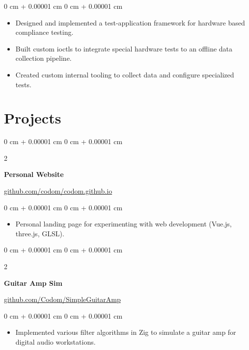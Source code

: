 \documentclass[10pt, letterpaper]{article}
\newenvironment{highlights}{
    \begin{itemize}[
        topsep=0.10 cm,
        parsep=0.10 cm,
        partopsep=0pt,
        itemsep=0pt,
        leftmargin=0 cm + 10pt
    ]
}{
    \end{itemize}
} %
\newenvironment{onecolentry}{
    \begin{adjustwidth}{
        0 cm + 0.00001 cm
    }{
        0 cm + 0.00001 cm
    }
}{
    \end{adjustwidth}
} %
\newenvironment{twocolentry}[2][]{
    \onecolentry
    \def\secondColumn{#2}
    \setcolumnwidth{\fill, 6.0 cm}
    \begin{paracol}{2}
}{
    \switchcolumn \raggedleft \secondColumn
    \end{paracol}
    \endonecolentry
} %
\begin{document}
        \vspace{0.10 cm}
        \begin{onecolentry}
            \begin{highlights}
              \item Designed and implemented a test-application framework for hardware based compliance testing.
              \item Built custom ioctls to integrate special hardware tests to an offline data collection pipeline.
              \item Created custom internal tooling to collect data and configure specialized tests.
            \end{highlights}
        \end{onecolentry}

    \section{Projects}
        \begin{twocolentry}{
            \href{https://github.com/codom/codom.github.io}{github.com/codom/codom.github.io}
        }
        \textbf{Personal Website}
        \end{twocolentry}

        \vspace{0.10 cm}
        \begin{onecolentry}
            \begin{highlights}
              \item Personal landing page for experimenting with web development (Vue.js, three.js, GLSL).
            \end{highlights}
        \end{onecolentry}

        \vspace{0.2 cm}

        \begin{twocolentry}{
            \href{https://github.com/Codom/SimpleGuitarAmp}{github.com/Codom/SimpleGuitarAmp}
        }
            \textbf{Guitar Amp Sim}
        \end{twocolentry}

        \vspace{0.10 cm}
        \begin{onecolentry}
            \begin{highlights}
                \item Implemented various filter algorithms in Zig to simulate a guitar amp for digital audio workstations.
            \end{highlights}
        \end{onecolentry}
\end{document}
